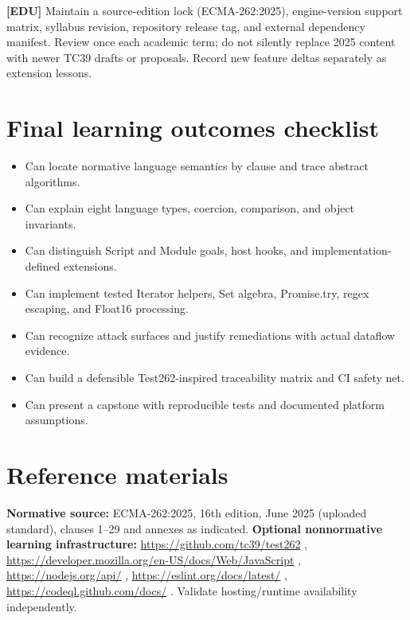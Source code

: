 \documentclass[11pt,letterpaper]{article}
\providecommand{\tightlist}{\setlength{\itemsep}{0pt}\setlength{\parskip}{0pt}}
\begin{document}
\textbf{{[}EDU{]}} Maintain a source-edition lock (ECMA-262:2025), engine-version support matrix, syllabus revision, repository release tag, and external dependency manifest. Review once each academic term; do not silently replace 2025 content with newer TC39 drafts or proposals. Record new feature deltas separately as extension lessons.

\section{Final learning outcomes checklist}\label{final-learning-outcomes-checklist}

\begin{itemize}
\tightlist
\item[$\square$]
  Can locate normative language semantics by clause and trace abstract algorithms.
\item[$\square$]
  Can explain eight language types, coercion, comparison, and object invariants.
\item[$\square$]
  Can distinguish Script and Module goals, host hooks, and implementation-defined extensions.
\item[$\square$]
  Can implement tested Iterator helpers, Set algebra, Promise.try, regex escaping, and Float16 processing.
\item[$\square$]
  Can recognize attack surfaces and justify remediations with actual dataflow evidence.
\item[$\square$]
  Can build a defensible Test262-inspired traceability matrix and CI safety net.
\item[$\square$]
  Can present a capstone with reproducible tests and documented platform assumptions.
\end{itemize}

\section{Reference materials}\label{reference-materials}

\textbf{Normative source:} ECMA-262:2025, 16th edition, June 2025 (uploaded standard), clauses 1--29 and annexes as indicated. \textbf{Optional nonnormative learning infrastructure:} \url{https://github.com/tc39/test262} , \url{https://developer.mozilla.org/en-US/docs/Web/JavaScript} , \url{https://nodejs.org/api/} , \url{https://eslint.org/docs/latest/} , \url{https://codeql.github.com/docs/} . Validate hosting/runtime availability independently.
\end{document}
